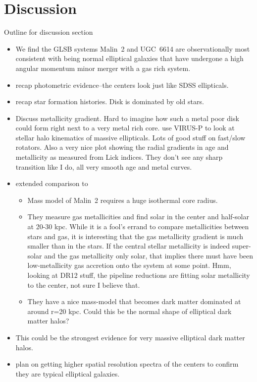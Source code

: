 \documentclass[12pt,preprint]{aastex}
\begin{document}
\section{Discussion}

Outline for discussion section
\begin{itemize}
\item{We find the GLSB systems Malin~2 and UGC~6614 are observationally most consistent with being normal elliptical galaxies that have undergone a high angular momentum minor merger with a gas rich system.}
\item{recap photometric evidence--the centers look just like SDSS ellipticals.}
\item{recap star formation histories. Disk is dominated by old stars.}
\item{Discuss metallicity gradient. Hard to imagine how such a metal poor disk could form right next to a very metal rich core.
      \citet{Raskutti14} use VIRUS-P to look at stellar halo kinematics of massive ellipticals.  Lots of good stuff on fast/slow rotators.  Also a very nice plot showing the radial gradients in age and metallicity as measured from Lick indices.  They don't see any sharp transition like I do, all very smooth age and metal curves. }
\item{extended comparison to \citet{Kasparova14}}
  \begin{itemize}
    \item{Mass model of Malin~2 requires a huge isothermal core radius.}
    \item{They measure gas metallicities and find solar in the center and half-solar at 20-30 kpc.  While it is a fool's errand to compare metallicities between stars and gas, it is interesting that the gas metallicity gradient is much smaller than in the stars.  If the central stellar metallicity is indeed super-solar and the gas metallicity only solar, that implies there must have been low-metallicity gas accretion onto the system at some point.  Hmm, looking at DR12 stuff, the pipeline reductions are fitting solar metallicity to the center, not sure I believe that.  }
      \item{They have a nice mass-model that becomes dark matter dominated at around r=20 kpc.  Could this be the normal shape of elliptical dark matter halos?}
  \end{itemize}
  
\item{This could be the strongest evidence for very massive elliptical dark matter halos. }
  \item{plan on getting higher spatial resolution spectra of the centers to confirm they are typical elliptical galaxies.}
\end{itemize}
\end{document}
